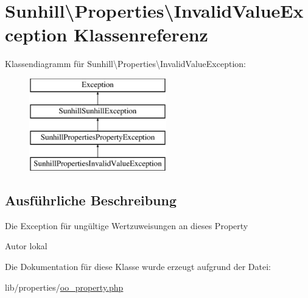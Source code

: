 \hypertarget{classSunhill_1_1Properties_1_1InvalidValueException}{}\section{Sunhill\textbackslash{}Properties\textbackslash{}Invalid\+Value\+Exception Klassenreferenz}
\label{classSunhill_1_1Properties_1_1InvalidValueException}
Klassendiagramm für Sunhill\textbackslash{}Properties\textbackslash{}Invalid\+Value\+Exception\+:\begin{figure}[H]
\begin{center}
\leavevmode
\includegraphics[height=4.000000cm]{d8/d05/classSunhill_1_1Properties_1_1InvalidValueException}
\end{center}
\end{figure}


\subsection{Ausführliche Beschreibung}
Die Exception für ungültige Wertzuweisungen an dieses Property \begin{DoxyAuthor}{Autor}
lokal 
\end{DoxyAuthor}


Die Dokumentation für diese Klasse wurde erzeugt aufgrund der Datei\+:\begin{DoxyCompactItemize}
\item 
lib/properties/\hyperlink{oo__property_8php}{oo\+\_\+property.\+php}\end{DoxyCompactItemize}
